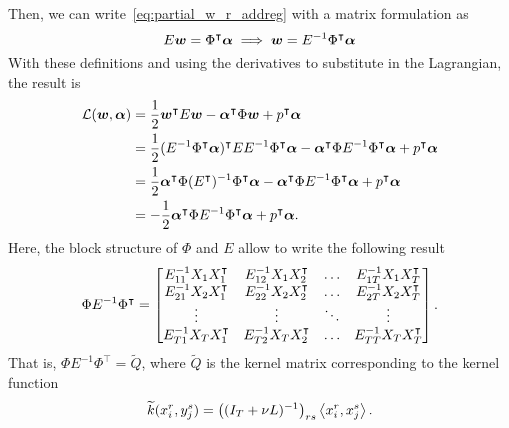 Then, we can write~\eqref{eq:partial_w_r_addreg} with a matrix formulation as
\begin{equation}
    \nonumber
    E \bm{w} = \Phi^\intercal \bm{\alpha} \implies \bm{w} = E^{-1} \Phi^\intercal \bm{\alpha}
\end{equation}
With these definitions and using the derivatives to substitute in the Lagrangian, the result is
\begin{align*}
    \mathcal{L}(\bm{w}, \bm{\alpha}) &= \frac{1}{2} \bm{w}^\intercal E \bm{w} - \bm{\alpha}^\intercal \Phi \bm{w} + p^\intercal \bm{\alpha} \\
    &= \frac{1}{2} (E^{-1} \Phi^\intercal \bm{\alpha})^\intercal E E^{-1} \Phi^\intercal \bm{\alpha} - \bm{\alpha}^\intercal \Phi E^{-1} \Phi^\intercal \bm{\alpha} + p^\intercal \bm{\alpha} \\
    &= \frac{1}{2} \bm{\alpha}^\intercal \Phi ({E^\intercal})^{-1} \Phi^\intercal \bm{\alpha}  - \bm{\alpha}^\intercal \Phi E^{-1} \Phi^\intercal \bm{\alpha} + p^\intercal \bm{\alpha} \\
    &= -\frac{1}{2}  \bm{\alpha}^\intercal \Phi E^{-1} \Phi^\intercal \bm{\alpha} + p^\intercal \bm{\alpha}.
\end{align*}
Here, the block structure of $\Phi$ and $E$ allow to write the following result 
\begin{equation}
    \label{eq:laplacian_block_linear}
    \Phi E^{-1} \Phi^\intercal = 
    \begin{bmatrix}
        E^{-1}_{11} X_1 X_1^\intercal & E^{-1}_{12} X_1 X_2^\intercal & \ldots & E^{-1}_{1\ntasks} X_1 X_\ntasks^\intercal \\
        E^{-1}_{21} X_2 X_1^\intercal & E^{-1}_{22} X_2 X_2^\intercal & \ldots & E^{-1}_{2\ntasks} X_2 X_\ntasks^\intercal \\
        \vdots & \vdots & \ddots & \vdots \\
        E^{-1}_{\ntasks1} X_\ntasks X_1^\intercal & E^{-1}_{\ntasks 2} X_\ntasks X_2^\intercal & \ldots & E^{-1}_{\ntasks \ntasks} X_\ntasks X_\ntasks^\intercal \\
    \end{bmatrix} .
\end{equation}
That is, $\Phi E^{-1} \Phi^\intercal = \widetilde{Q}$, where $ \widetilde{Q}$ is the kernel matrix corresponding to the kernel function 
\begin{equation}
    \label{eq:kernelfun_gl}
    \widetilde{k}(x_i^r, y_j^s) =  \left((I_T + \nu L)^{-1}\right)_{rs} \dotp{x_i^r}{x_j^s}.
\end{equation}
